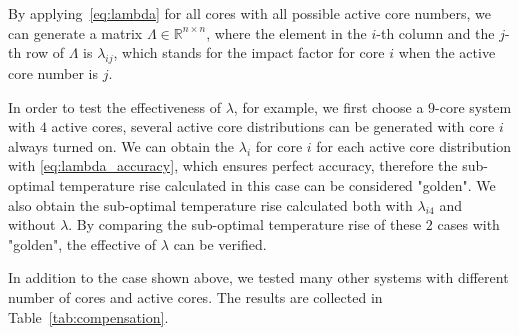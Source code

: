 
By applying~\eqref{eq:lambda} for all cores with all possible active core
numbers, we can generate a matrix $\Lambda \in \mathbb{R}^{n\times
  n}$, where the element in the $i$-th column and the $j$-th row of
$\Lambda$ is $\lambda_{ij}$, which stands for the impact factor for
core $i$ when the active core number is $j$.

In order to test the effectiveness of $\lambda$, for example, we first choose a $9$-core system with $4$ active cores, several active core distributions can be generated with core $i$ always turned on. We can obtain the $\lambda_{i}$ for core $i$ for each active core distribution with \eqref{eq:lambda_accuracy}, which ensures perfect accuracy, therefore the sub-optimal temperature rise calculated in this case can be considered "golden". We also obtain the sub-optimal temperature rise calculated both with $\lambda_{i4}$ and without $\lambda$. By comparing the sub-optimal temperature rise of these $2$ cases with "golden", the effective of $\lambda$ can be verified.

In addition to the case shown above, we tested many other systems with
different number of cores and active cores. The results are collected
in Table~\ref{tab:compensation}.


